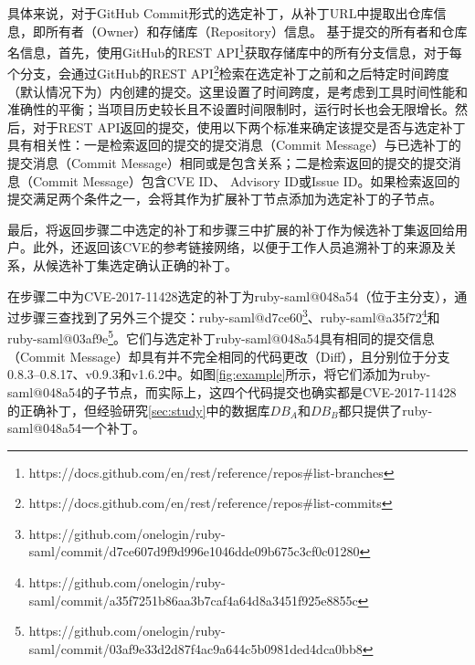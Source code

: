 具体来说，对于GitHub Commit形式的选定补丁，\tool 从补丁URL中提取出仓库信息，即所有者（Owner）和存储库（Repository）信息。
基于提交的所有者和仓库名信息，首先，\tool 使用GitHub的REST API\footnote{https://docs.github.com/en/rest/reference/repos\#list-branches}获取存储库中的所有分支信息，对于每个分支，\tool 会通过GitHub的REST API\footnote{https://docs.github.com/en/rest/reference/repos\#list-commits}检索在选定补丁之前和之后特定时间跨度（默认情况下为）内创建的提交。这里设置了时间跨度，是考虑到工具时间性能和准确性的平衡；当项目历史较长且不设置时间限制时，\tool 运行时长也会无限增长。然后，对于REST API返回的提交，\tool 使用以下两个标准来确定该提交是否与选定补丁具有相关性：一是检索返回的提交的提交消息（Commit Message）与已选补丁的提交消息（Commit Message）相同或是包含关系；二是检索返回的提交的提交消息（Commit Message）包含CVE ID、 Advisory ID或Issue ID。如果检索返回的提交满足两个条件之一，\tool 会将其作为扩展补丁节点添加为选定补丁的子节点。

最后，\tool 将返回步骤二中选定的补丁和步骤三中扩展的补丁作为候选补丁集返回给用户。此外，\tool 还返回该CVE的参考链接网络，以便于工作人员追溯补丁的来源及关系，从候选补丁集选定确认正确的补丁。


\begin{exmp}
在步骤二中为CVE-2017-11428选定的补丁为ruby-saml@048a54（位于主分支），\tool 通过步骤三查找到了另外三个提交：ruby-saml@d7ce60\footnote{https://github.com/onelogin/ruby-saml/commit/d7ce607d9f9d996e1046dde09b675c3cf0c01280}、ruby-saml@a35f72\footnote{https://github.com/onelogin/ruby-saml/commit/a35f7251b86aa3b7caf4a64d8a3451f925e8855c}和ruby-saml@03af9e\footnote{https://github.com/onelogin/ruby-saml/commit/03af9e33d2d87f4ac9a644c5b0981ded4dca0bb8}。它们与选定补丁ruby-saml@048a54具有相同的提交信息（Commit Message）却具有并不完全相同的代码更改（Diff），且分别位于分支0.8.3--0.8.17、v0.9.3和v1.6.2中。如图\ref{fig:example}所示，\tool 将它们添加为ruby-saml@048a54的子节点，而实际上，这四个代码提交也确实都是CVE-2017-11428的正确补丁，但经验研究\ref{sec:study}中的数据库$DB_A$和$DB_B$都只提供了ruby-saml@048a54一个补丁。
\end{exmp}